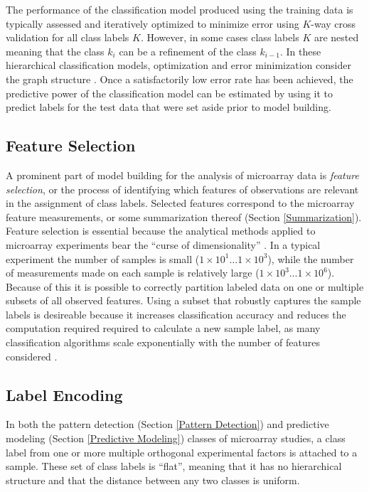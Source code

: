 The performance of the classification model produced using the training data is
typically assessed and iteratively optimized to minimize error using $K$-way
cross validation for all class labels $K$.  However, in some cases class labels
$K$ are nested meaning that the class $k_{i}$ can be a refinement of the
class $k_{i-1}$.  In these hierarchical classification models, optimization and
error minimization consider the graph structure \cite{pachinko}.  Once a
satisfactorily low error rate has been achieved, the predictive power of the
classification model can be estimated by using it to predict labels for the
test data that were set aside prior to model building.

\subsection{Feature Selection}
\label{Feature Selection}

A prominent part of model building for the analysis of microarray data is
\emph{feature selection}, or the process of identifying which features of
observations are relevant in the assignment of class labels.  Selected features
correspond to the microarray feature measurements, or some summarization
thereof (Section \ref{Summarization}).  Feature selection is essential because
the analytical methods applied to microarray experiments bear the ``curse of
dimensionality'' \cite{Bellman_1957}.  In a typical experiment the number of
samples is small ($1{\times}10^1 \dots 1{\times}10^3$), while the number of
measurements made on each sample is relatively large ($1{\times}10^3 \dots
1{\times}10^6$).  Because of this it is possible to correctly partition labeled
data on one or multiple subsets of all observed features.  Using a subset that
robustly captures the sample labels is desireable because it increases
classification accuracy and reduces the computation required required to
calculate a new sample label, as many classification algorithms scale
exponentially with the number of features considered \cite{john94irrelevant}.

\subsection{Label Encoding}
\label{Label Encoding}

In both the pattern detection (Section \ref{Pattern Detection}) and
predictive modeling (Section \ref{Predictive Modeling}) classes of microarray
studies, a class label from one or more multiple orthogonal experimental
factors is attached to a sample.  These set of class labels is ``flat'',
meaning that it has no hierarchical structure and that the distance between any
two classes is uniform.  


